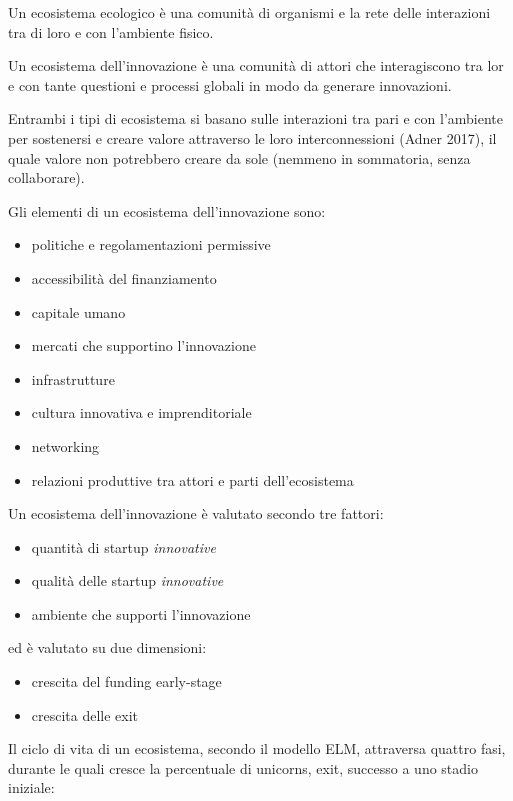 \documentclass[answers, a4paper, 11pt]{exam}
\begin{document}
Un ecosistema ecologico è una comunità di organismi e la rete delle interazioni tra di loro e con l'ambiente fisico.

Un ecosistema dell'innovazione è una comunità di attori che interagiscono tra lor e con tante questioni e processi globali in modo da generare innovazioni.

Entrambi i tipi di ecosistema si basano sulle interazioni tra pari e con l'ambiente per sostenersi e creare valore attraverso le loro interconnessioni (Adner 2017), il quale valore non potrebbero creare da sole (nemmeno in sommatoria, senza collaborare).

Gli elementi di un ecosistema dell'innovazione sono:
\begin{itemize}
    \item politiche e regolamentazioni permissive
    \item accessibilità del finanziamento
    \item capitale umano
    \item mercati che supportino l'innovazione
    \item infrastrutture
    \item cultura innovativa e imprenditoriale
    \item networking
    \item relazioni produttive tra attori e parti dell'ecosistema
\end{itemize}

Un ecosistema dell'innovazione è valutato secondo tre fattori:

\begin{itemize}
    \item quantità di startup \emph{innovative}
    \item qualità delle startup \emph{innovative}
    \item ambiente che supporti l'innovazione
\end{itemize}

ed è valutato su due dimensioni:

\begin{itemize}
    \item crescita del funding early-stage
    \item crescita delle exit
\end{itemize}

Il ciclo di vita di un ecosistema, secondo il modello ELM, attraversa quattro fasi, durante le quali cresce la percentuale di unicorns, exit, successo a uno stadio iniziale:
\end{document}
